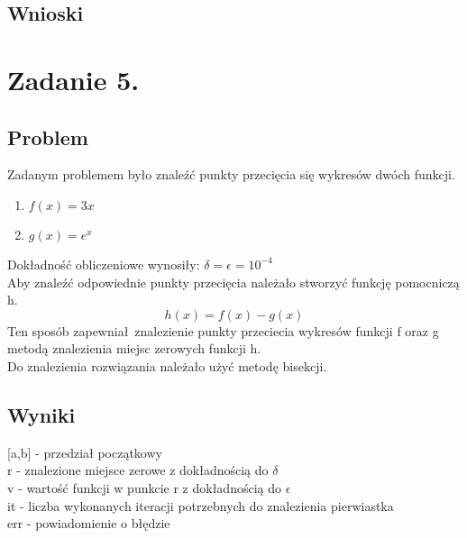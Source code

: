 \documentclass[11pt, a4paper]{article}
\begin{document}
    \subsection{Wnioski}

    \section{Zadanie 5.}
    \subsection{Problem}
    Zadanym problemem było znaleźć punkty przecięcia się wykresów dwóch funkcji.
    \begin{enumerate}
        \item $f(x) = 3x$
        \item $g(x) = e^{x}$
    \end{enumerate}
    Dokładność obliczeniowe wynosiły: $\delta = \epsilon = 10^{-4}$\\
    Aby znaleźć odpowiednie punkty przecięcia należało stworzyć funkcję pomocniczą h.
    \[h(x) = f(x) - g(x)\]
    Ten sposób zapewniał znalezienie punkty przeciecia wykresów funkcji f oraz g metodą znalezienia miejsc zerowych funkcji h.\\
    Do znalezienia rozwiązania należało użyć metodę bisekcji.
    \subsection{Wyniki}
    [a,b] - przedział początkowy \\
    r - znalezione miejsce zerowe z dokładnością do $\delta$ \\
    v - wartość funkcji w punkcie r z dokładnością do $\epsilon$ \\
    it - liczba wykonanych iteracji potrzebnych do znalezienia pierwiastka \\
    err - powiadomienie o błędzie
\end{document}
